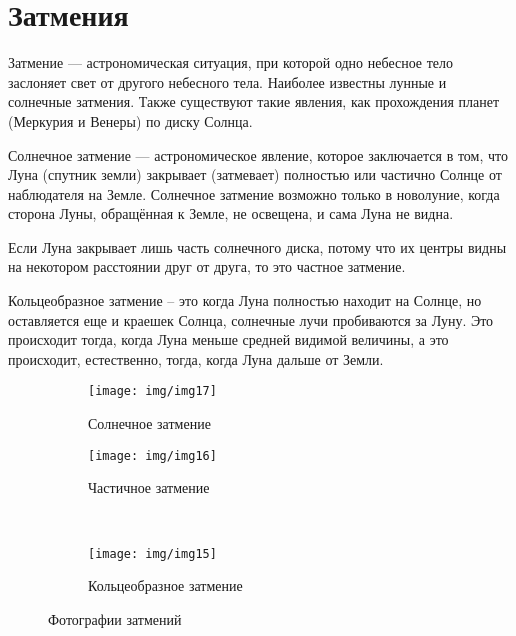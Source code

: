 \documentclass[11pt,a4paper]{article}
\begin{document}
	\section{Затмения}
	\hspace{17pt}Затмение — астрономическая ситуация, при которой одно небесное тело заслоняет свет от другого небесного тела. Наиболее известны лунные и солнечные затмения. Также существуют такие явления, как прохождения планет (Меркурия и Венеры) по диску Солнца.\par
	Солнечное затмение — астрономическое явление, которое заключается в том, что Луна (спутник земли) закрывает (затмевает) полностью или частично Солнце от наблюдателя на Земле. Солнечное затмение возможно только в новолуние, когда сторона Луны, обращённая к Земле, не освещена, и сама Луна не видна. \par
	Если Луна закрывает лишь часть солнечного диска, потому что их центры видны на некотором расстоянии друг от друга, то это частное затмение.\par
	Кольцеобразное затмение – это когда Луна полностью находит на Солнце, но оставляется еще и краешек Солнца, солнечные лучи пробиваются за Луну. Это происходит тогда, когда Луна меньше средней видимой величины, а это происходит, естественно, тогда, когда Луна дальше от Земли.
	\begin{figure}[p]
	\centering
	\begin{subfigure}{0.3\textwidth}
			\centering
			\texttt{[image: img/img17]}
			\caption{Солнечное затмение}
	\end{subfigure}
	\hspace{0.1\textwidth}
	\begin{subfigure}{0.3\textwidth}
			\centering
			\texttt{[image: img/img16]}
			\caption{Частичное затмение}		
	\end{subfigure} \\
	\begin{subfigure}{0.3\textwidth}
		\centering
		\texttt{[image: img/img15]}
		\caption{Кольцеобразное затмение}
	\end{subfigure}
	\caption{Фотографии затмений}
	\end{figure}
\end{document}
